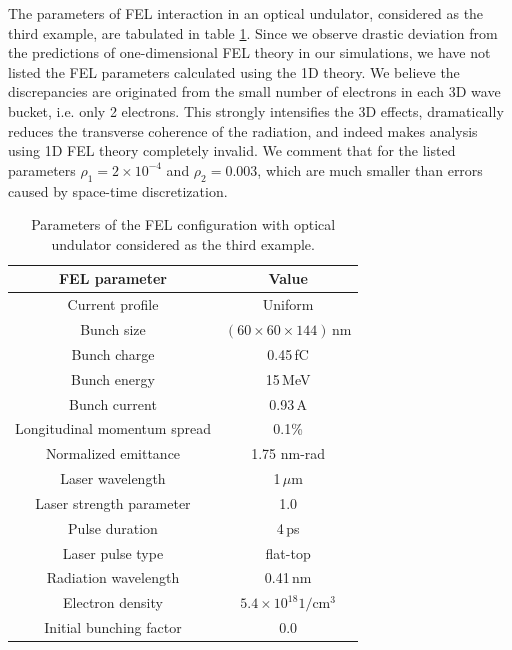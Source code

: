 The parameters of FEL interaction in an optical undulator, considered as the third example, are tabulated in table \ref{example3}.
%
Since we observe drastic deviation from the predictions of one-dimensional FEL theory in our simulations, we have not listed the FEL parameters calculated using the 1D theory.
%
We believe the discrepancies are originated from the small number of electrons in each 3D wave bucket, i.e. only 2 electrons.
%
This strongly intensifies the 3D effects, dramatically reduces the transverse coherence of the radiation, and indeed makes analysis using 1D FEL theory completely invalid.
%
We comment that for the listed parameters $\rho_1=2\times10^{-4}$ and $\rho_2=0.003$, which are much smaller than errors caused by space-time discretization.
%
\begin{table}
\label{example3}
\caption{Parameters of the FEL configuration with optical undulator considered as the third example.}
\centering
\begin{tabular}{|c||c|}
\hline
FEL parameter & Value \\ \hline \hline
Current profile & Uniform \\ \hline
Bunch size & $(60\times60\times144)$\,nm \\ \hline
Bunch charge & 0.45\,fC \\ \hline
Bunch energy & 15\,MeV \\	\hline
Bunch current & 0.93\,A \\ \hline
Longitudinal momentum spread & 0.1\% \\ \hline
Normalized emittance & 1.75 nm-rad \\	\hline
Laser wavelength & 1\,$\mu$m \\ \hline
Laser strength parameter & 1.0 \\ \hline
Pulse duration & 4\,ps \\ \hline
Laser pulse type & flat-top \\ \hline
Radiation wavelength & 0.41\,nm \\ \hline
Electron density & $5.4\times10^{18} 1/\text{cm}^3$ \\ \hline
Initial bunching factor & $0.0$ \\ \hline
\end{tabular}
\end{table}

